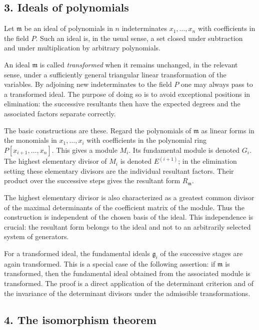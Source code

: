 \documentclass[11pt]{article}
\begin{document}
\subsection{3. Ideals of polynomials}

Let $\mathfrak m$ be an ideal of polynomials in $n$ indeterminates $x_1,\ldots,x_n$ with coefficients in the field $P$. Such an ideal is, in the usual sense, a set closed under subtraction and under multiplication by arbitrary polynomials.

An ideal $\mathfrak m$ is called \emph{transformed} when it remains unchanged, in the relevant sense, under a sufficiently general triangular linear transformation of the variables. By adjoining new indeterminates to the field $P$ one may always pass to a transformed ideal. The purpose of doing so is to avoid exceptional positions in elimination: the successive resultants then have the expected degrees and the associated factors separate correctly.

The basic constructions are these. Regard the polynomials of $\mathfrak m$ as linear forms in the monomials in $x_1,\ldots,x_i$ with coefficients in the polynomial ring $P[x_{i+1},\ldots,x_n]$. This gives a module $M_i$. Its fundamental module is denoted $G_i$. The highest elementary divisor of $M_i$ is denoted $E^{(i+1)}$; in the elimination setting these elementary divisors are the individual resultant factors. Their product over the successive steps gives the resultant form $R_{\mathfrak m}$.

The highest elementary divisor is also characterized as a greatest common divisor of the maximal determinants of the coefficient matrix of the module. Thus the construction is independent of the chosen basis of the ideal. This independence is crucial: the resultant form belongs to the ideal and not to an arbitrarily selected system of generators.

For a transformed ideal, the fundamental ideals $\mathfrak g_i$ of the successive stages are again transformed. This is a special case of the following assertion: if $\mathfrak m$ is transformed, then the fundamental ideal obtained from the associated module is transformed. The proof is a direct application of the determinant criterion and of the invariance of the determinant divisors under the admissible transformations.

\subsection{4. The isomorphism theorem}
\end{document}
